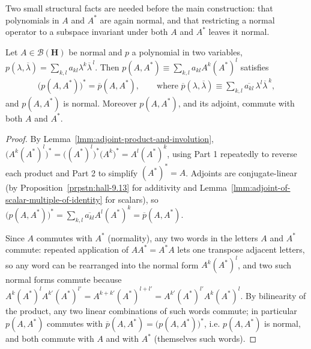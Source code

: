 Two small structural facts are needed before the main construction: that polynomials in $A$ and $A^*$ are again normal, and that restricting a normal operator to a subspace invariant under both $A$ and $A^*$ leaves it normal.

\begin{lemma}
    \label{lmm:polynomials-in-normal-are-normal}
    \leanok
    Let $A \in \mathcal{B}(\mathbf{H})$ be normal and $p$ a polynomial in two variables, $p(\lambda,\overline\lambda) = \sum_{k,l} a_{kl}\lambda^k\overline\lambda^{\,l}$. Then $p(A,A^*) \equiv \sum_{k,l} a_{kl}A^k(A^*)^l$ satisfies
    \begin{align}
        \big( p(A,A^*) \big)^* = \overline{p}(A,A^*), \qquad \text{where } \overline{p}(\lambda,\overline\lambda) \equiv \sum_{k,l} \overline{a_{kl}}\,\lambda^l\overline\lambda^{\,k},
    \end{align}
    and $p(A,A^*)$ is normal. Moreover $p(A,A^*)$, and its adjoint, commute with both $A$ and $A^*$.
\end{lemma}
\begin{proof}
    \leanok
By Lemma~\ref{lmm:adjoint-product-and-involution}, $\big( A^k(A^*)^l \big)^* = \big((A^*)^l\big)^*\big(A^k\big)^* = A^l (A^*)^k$, using Part 1 repeatedly to reverse each product and Part 2 to simplify $(A^*)^* = A$. Adjoints are conjugate-linear (by Proposition~\ref{prpstn:hall-9.13} for additivity and Lemma~\ref{lmm:adjoint-of-scalar-multiple-of-identity} for scalars), so $\big( p(A,A^*) \big)^* = \sum_{k,l}\overline{a_{kl}}A^l(A^*)^k = \overline{p}(A,A^*)$.

Since $A$ commutes with $A^*$ (normality), any two words in the letters $A$ and $A^*$ commute: repeated application of $AA^*=A^*A$ lets one transpose adjacent letters, so any word can be rearranged into the normal form $A^k(A^*)^l$, and two such normal forms commute because $A^k(A^*)^lA^{k'}(A^*)^{l'} = A^{k+k'}(A^*)^{l+l'} = A^{k'}(A^*)^{l'}A^k(A^*)^l$. By bilinearity of the product, any two linear combinations of such words commute; in particular $p(A,A^*)$ commutes with $\overline{p}(A,A^*) = \big(p(A,A^*)\big)^*$, i.e. $p(A,A^*)$ is normal, and both commute with $A$ and with $A^*$ (themselves such words).
\end{proof}

